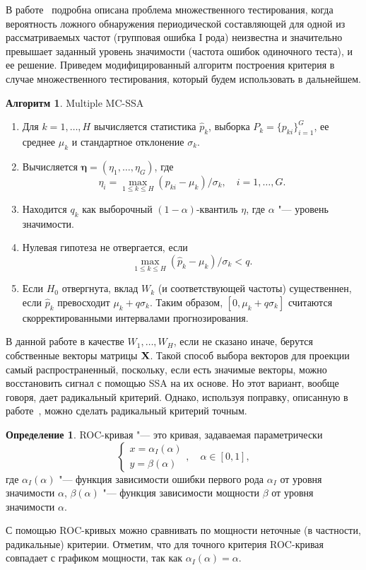 \documentclass[specialist,
substylefile = spbu_report.rtx,
subf,href,colorlinks=true, 12pt]{disser}
\theoremstyle{definition}
\newtheorem{definition}{Определение}
\newtheorem{algorithm}{Алгоритм}
\begin{document}
В работе~\cite{Golyandina_2023} подробна описана проблема множественного тестирования, когда вероятность ложного обнаружения периодической составляющей для одной из рассматриваемых частот (групповая ошибка I рода) неизвестна и значительно превышает заданный уровень значимости (частота ошибок одиночного теста), и ее решение. Приведем модифицированный алгоритм построения критерия в случае множественного тестирования, который будем использовать в дальнейшем.
\begin{algorithm}{Multiple MC-SSA~\cite{Golyandina_2023}}
	\begin{enumerate}
		\item Для $k=1,\dots,H$ вычисляется статистика $\widehat{p}_k$, выборка $P_k=\{p_{ki}\}_{i=1}^G$, ее среднее $\mu_k$ и стандартное отклонение $\sigma_k$.
		\item Вычисляется $\mathbf{\eta}=(\eta_1,\dots,\eta_G)$, где
		      \[
			      \eta_i=\max_{1\leqslant k\leqslant H}(p_{ki}-\mu_k)/\sigma_k,\quad i=1,\dots,G.
		      \]
		\item Находится $q_k$ как выборочный $(1-\alpha)$-квантиль $\eta$, где $\alpha$ "--- уровень значимости.
		\item Нулевая гипотеза не отвергается, если
		      \[
			      \max_{1\leqslant k\leqslant H}(\widehat{p}_k-\mu_k)/\sigma_k<q.
		      \]
		\item Если $H_0$ отвергнута, вклад $W_k$ (и соответствующей частоты) существеннен, если $\widehat{p}_k$ превосходит $\mu_k+q\sigma_k$. Таким образом, $[0,\mu_k+q\sigma_k]$ считаются скорректированными интервалами прогнозирования.
	\end{enumerate}
\end{algorithm}

В данной работе в качестве $W_1, \ldots,W_H$, если не сказано иначе, берутся собственные векторы матрицы $\mathbf{X}$. Такой способ выбора векторов для проекции самый распространенный, поскольку, если есть значимые векторы, можно восстановить сигнал с помощью SSA на их основе. Но этот вариант, вообще говоря, дает радикальный критерий. Однако, используя поправку, описанную в работе~\cite{Larin_2022}, можно сделать радикальный критерий точным.

\begin{definition}
	ROC-кривая "--- это кривая, задаваемая параметрически
	\[
		\begin{cases}
			x=\alpha_I(\alpha) \\
			y=\beta(\alpha)
		\end{cases},\quad \alpha\in[0,1],
	\]
	где $\alpha_I(\alpha)$ "--- функция зависимости ошибки первого рода $\alpha_I$ от уровня значимости $\alpha$, $\beta(\alpha)$ "--- функция зависимости мощности $\beta$ от уровня значимости $\alpha$.
\end{definition}
С помощью ROC-кривых можно сравнивать по мощности неточные (в частности, радикальные) критерии. Отметим, что для точного критерия ROC-кривая совпадает с графиком мощности, так как $\alpha_I(\alpha)=\alpha$.
\end{document}
